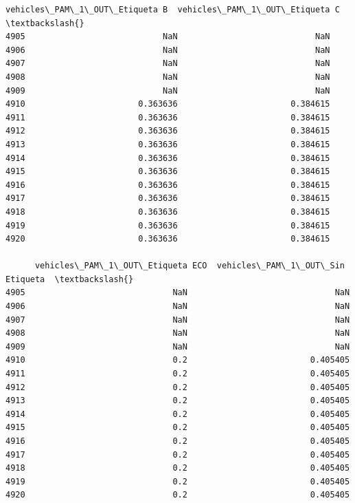 \documentclass[11pt]{article}
\begin{document}
\begin{tcolorbox}[breakable, size=fbox, boxrule=.5pt, pad at break*=1mm, opacityfill=0]
\begin{Verbatim}[commandchars=\\\{\}]
      vehicles\_PAM\_1\_OUT\_Etiqueta B  vehicles\_PAM\_1\_OUT\_Etiqueta C  \textbackslash{}
4905                            NaN                            NaN
4906                            NaN                            NaN
4907                            NaN                            NaN
4908                            NaN                            NaN
4909                            NaN                            NaN
4910                       0.363636                       0.384615
4911                       0.363636                       0.384615
4912                       0.363636                       0.384615
4913                       0.363636                       0.384615
4914                       0.363636                       0.384615
4915                       0.363636                       0.384615
4916                       0.363636                       0.384615
4917                       0.363636                       0.384615
4918                       0.363636                       0.384615
4919                       0.363636                       0.384615
4920                       0.363636                       0.384615

      vehicles\_PAM\_1\_OUT\_Etiqueta ECO  vehicles\_PAM\_1\_OUT\_Sin Etiqueta  \textbackslash{}
4905                              NaN                              NaN
4906                              NaN                              NaN
4907                              NaN                              NaN
4908                              NaN                              NaN
4909                              NaN                              NaN
4910                              0.2                         0.405405
4911                              0.2                         0.405405
4912                              0.2                         0.405405
4913                              0.2                         0.405405
4914                              0.2                         0.405405
4915                              0.2                         0.405405
4916                              0.2                         0.405405
4917                              0.2                         0.405405
4918                              0.2                         0.405405
4919                              0.2                         0.405405
4920                              0.2                         0.405405


\end{Verbatim}
\end{tcolorbox}
\end{document}
